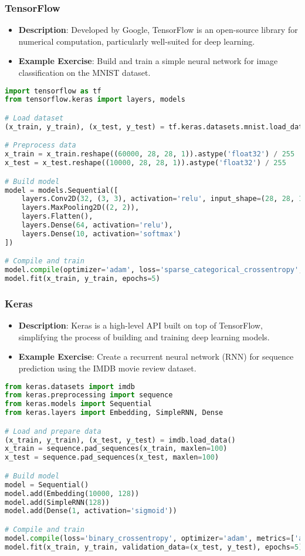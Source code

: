 \documentclass{beamer}
\begin{document}
\begin{frame}[fragile]
    \frametitle{TensorFlow}
    \begin{itemize}
        \item \textbf{Description}: Developed by Google, TensorFlow is an open-source library for numerical computation, particularly well-suited for deep learning.
        \item \textbf{Example Exercise}: Build and train a simple neural network for image classification on the MNIST dataset.
    \end{itemize}
    \begin{lstlisting}[language=Python, caption=TensorFlow Code Snippet]
import tensorflow as tf
from tensorflow.keras import layers, models

# Load dataset
(x_train, y_train), (x_test, y_test) = tf.keras.datasets.mnist.load_data()

# Preprocess data
x_train = x_train.reshape((60000, 28, 28, 1)).astype('float32') / 255
x_test = x_test.reshape((10000, 28, 28, 1)).astype('float32') / 255

# Build model
model = models.Sequential([
    layers.Conv2D(32, (3, 3), activation='relu', input_shape=(28, 28, 1)),
    layers.MaxPooling2D((2, 2)),
    layers.Flatten(),
    layers.Dense(64, activation='relu'),
    layers.Dense(10, activation='softmax')
])

# Compile and train
model.compile(optimizer='adam', loss='sparse_categorical_crossentropy', metrics=['accuracy'])
model.fit(x_train, y_train, epochs=5)
    \end{lstlisting}
\end{frame}

\begin{frame}[fragile]
    \frametitle{Keras}
    \begin{itemize}
        \item \textbf{Description}: Keras is a high-level API built on top of TensorFlow, simplifying the process of building and training deep learning models.
        \item \textbf{Example Exercise}: Create a recurrent neural network (RNN) for sequence prediction using the IMDB movie review dataset.
    \end{itemize}
    \begin{lstlisting}[language=Python, caption=Keras Code Snippet]
from keras.datasets import imdb
from keras.preprocessing import sequence
from keras.models import Sequential
from keras.layers import Embedding, SimpleRNN, Dense

# Load and prepare data
(x_train, y_train), (x_test, y_test) = imdb.load_data()
x_train = sequence.pad_sequences(x_train, maxlen=100)
x_test = sequence.pad_sequences(x_test, maxlen=100)

# Build model
model = Sequential()
model.add(Embedding(10000, 128))
model.add(SimpleRNN(128))
model.add(Dense(1, activation='sigmoid'))

# Compile and train
model.compile(loss='binary_crossentropy', optimizer='adam', metrics=['accuracy'])
model.fit(x_train, y_train, validation_data=(x_test, y_test), epochs=5)
    \end{lstlisting}
\end{frame}
\end{document}
